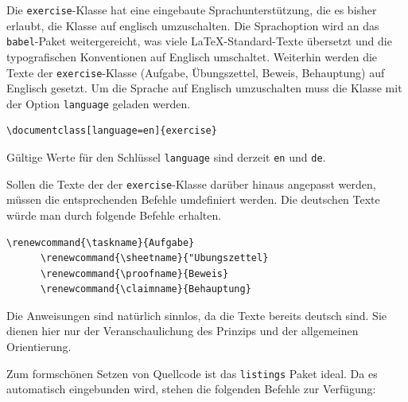 \documentclass{exercise}
\begin{document}
    Die \texttt{exercise}-Klasse hat eine eingebaute Sprachunterstützung, die es bisher erlaubt, die Klasse auf englisch umzuschalten. Die Sprachoption wird an das \texttt{babel}-Paket \cite{babel} weitergereicht, was viele \LaTeX{}-Standard-Texte übersetzt und die typografischen Konventionen auf Englisch umschaltet. Weiterhin werden die Texte der \texttt{exercise}-Klasse (Aufgabe, Übungszettel, Beweis, Behauptung) auf Englisch gesetzt. Um die Sprache auf Englisch umzuschalten muss die Klasse mit der Option \lstinline{language} geladen werden.
    \begin{lstlisting}[gobble=6]
      \documentclass[language=en]{exercise}
    \end{lstlisting}
    Gültige Werte für den Schlüssel \lstinline{language} sind derzeit \lstinline{en} und \lstinline{de}.

    Sollen die Texte der der \texttt{exercise}-Klasse darüber hinaus angepasst werden, müssen die entsprechenden Befehle umdefiniert werden. Die deutschen Texte würde man durch folgende Befehle erhalten.
    \begin{lstlisting}[gobble=6]
      \renewcommand{\taskname}{Aufgabe}
      \renewcommand{\sheetname}{"Ubungszettel}
      \renewcommand{\proofname}{Beweis}
      \renewcommand{\claimname}{Behauptung}
    \end{lstlisting}
    Die Anweisungen sind natürlich sinnlos, da die Texte bereits deutsch sind. Sie dienen hier nur der Veranschaulichung des Prinzips und der allgemeinen Orientierung.


    Zum formschönen Setzen von Quellcode ist das \texttt{listings} Paket
    \cite{listings} ideal. Da es automatisch eingebunden wird, stehen die
    folgenden Befehle zur Verfügung:
\end{document}
